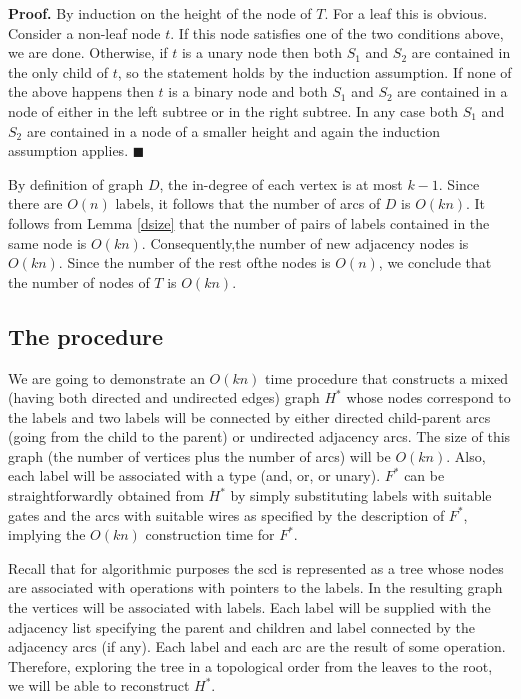 \documentclass{llncs}
\begin{document}
{\bf Proof.}
By induction on the height of the node of $T$.
For a leaf this is obvious. Consider a non-leaf node $t$. If this node satisfies
one of the two conditions above, we are done. Otherwise, if $t$ is a unary node
then both $S_1$ and $S_2$ are contained in the only child of $t$, so the statement
holds by the induction assumption. If none of the above happens then $t$
is a binary node and both $S_1$ and $S_2$ are contained in a node of either in the left subtree
or in the right subtree. In any case both $S_1$ and $S_2$ are contained in a node of a smaller
height and again the induction assumption applies. $\blacksquare$

By definition of graph $D$, the in-degree of each vertex is at most $k-1$.
Since there are $O(n)$ labels, it follows that the number of arcs of $D$
is $O(kn)$. It follows from Lemma \ref{dsize} that the number of pairs of
labels contained in the same node is $O(kn)$. Consequently,the number of
new adjacency nodes is $O(kn)$. Since the number of the rest ofthe nodes
is $O(n)$, we conclude that the number of nodes of $T$ is $O(kn)$.

\subsection{The procedure}
We are going to demonstrate an $O(kn)$ time procedure that constructs a mixed (having both directed and undirected
edges) graph $H^*$ whose nodes correspond to the labels and two labels will be connected by either directed child-parent arcs
(going from the child to the parent) or undirected adjacency arcs. The size of this graph (the number of vertices plus the number of arcs)
will be $O(kn)$. Also, each label will be associated with a type ({\sc and}, {\sc or}, or unary). $F^*$ can be straightforwardly obtained from $H^*$
by simply substituting labels with suitable gates and the arcs with suitable wires as specified by the description of $F^*$, implying
the $O(kn)$ construction time for $F^*$.

Recall that for algorithmic purposes the {\sc scd} is represented as a tree whose nodes are associated with operations
with pointers to the labels. In the resulting graph the vertices will be associated with labels. Each label will be supplied
with the adjacency list specifying the parent and children and label connected by the adjacency arcs (if any).
Each label and each arc are the result of some operation. Therefore, exploring the tree in a topological
order from the leaves to the root, we will be able to reconstruct $H^*$. 
\end{document}

